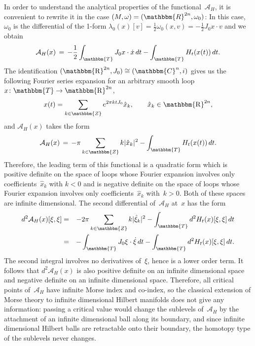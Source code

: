 \documentclass[12pt,twoside]{amsart}
\theoremstyle{plain}
\numberwithin{figure}{section}
\numberwithin{equation}{section}
\def\ca{{\mathcal A}}
\def\CC{\mathbbm{C}}
\def\RR{\mathbbm{R}}
\def\TT{\mathbbm{T}}
\def\ZZ{\mathbbm{Z}}
\def\R{\operatorname{\mathbbm{R}}}
\begin{document}
In order to understand the analytical properties of the functional~$\ca_H$, 
it is convenient to rewrite it in the case $(M,\omega) = (\RR^{2n},\omega_0)$: 
In this case, $\omega_0$ is the differential of the 1-form 
$\lambda_0(x)[v] = \frac 12  \omega_0(x,v) = -\frac 12  J_0 x\cdot v$ and we obtain 
\[
\ca_H (x) \,=\, -\frac{1}{2} \int_{\TT} J_0 x\cdot \dot{x} \, dt - \int_{\TT} H_t(x(t)) \,dt.
\]
The identification $(\R^{2n},J_0) \cong (\CC^n,i)$ gives us the following Fourier series expansion 
for an arbitrary smooth loop $x \colon \TT \rightarrow \R^{2n}$,
\[
x(t) = \sum_{k\in \ZZ} e^{2\pi k t J_0} \hat{x}_k, \qquad \hat{x}_k\in \R^{2n},
\]
and $\ca_H(x)$ takes the form
\begin{equation}
\label{fourier}
\ca_H (x) \,=\, -\pi \sum_{k\in \ZZ} k |\hat{x}_k|^2 - \int_{\TT} H_t(x(t)) \,dt.
\end{equation}
Therefore, the leading term of this functional is a quadratic form which is 
positive definite on the space of loops whose Fourier expansion involves only 
coefficients~$\hat{x}_k$ with $k<0$ and is negative definite on the space of loops 
whose Fourier expansion involves only coefficients~$\hat{x}_k$ with~$k>0$. 
Both of these spaces are infinite dimensional. The second differential of~$\ca_H$ 
at~$x$ has the form
\begin{eqnarray*}
d^2\ca_H (x)[\xi,\xi] 
&=& 
-2\pi \sum_{k\in \ZZ} k |\hat{\xi}_k|^2 - \int_{\TT} d^2H_t(x)[\xi,\xi] \,dt \\
&=& 
- \int_{\TT} J_0 \xi \cdot \dot \xi \,dt - \int_{\TT} d^2H_t(x)[\xi,\xi] \,dt .
\end{eqnarray*}
The second integral involves no derivatives of~$\xi$, hence is a lower order term.
It follows that $d^2\ca_H (x)$ is also positive definite on an infinite dimensional space 
and negative definite on an infinite dimensional space. 
Therefore, all critical points of~$\ca_H$ have infinite Morse index and co-index, 
so the classical extension of Morse theory to infinite dimensional Hilbert manifolds 
does not give any information: passing a critical value would change the sublevels 
of~$\ca_H$ by the attachment of an infinite dimensional ball along its boundary, 
and since infinite dimensional Hilbert balls are retractable onto their boundary, 
the homotopy type of the sublevels never changes.
\end{document}
